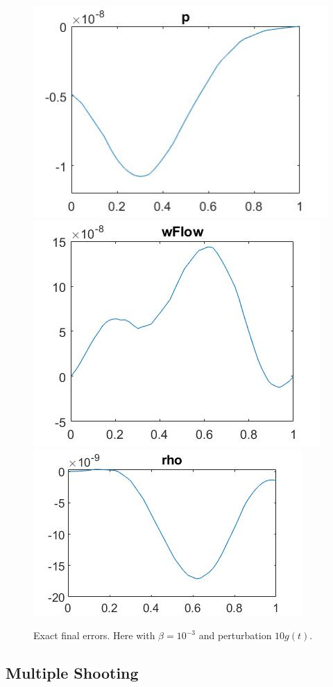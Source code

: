 \documentclass[11pt, a4paper]{article}
\theoremstyle{definition}
\begin{document}
\begin{figure}[h]
	\includegraphics[scale=0.3]{KalDnew1.jpg}
	\includegraphics[scale=0.3]{KalDnew2.jpg}
	\includegraphics[scale=0.3]{KalDnew3.jpg}
	\caption{Exact final errors. Here with $\beta =10^{-3}$ and perturbation $10g(t)$.}
	\label{Figlint4b}
\end{figure}


\subsection*{Multiple Shooting}
\end{document}
